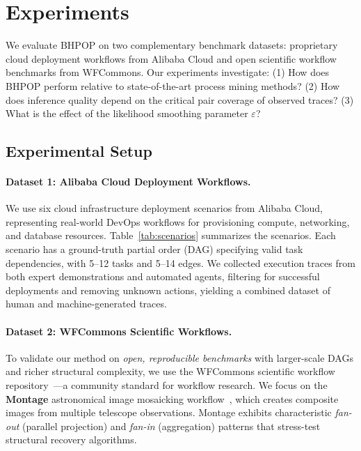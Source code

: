 \section{Experiments}
\label{sec:experiments}

We evaluate \textsc{BHPOP} on two complementary benchmark datasets: proprietary cloud deployment workflows from Alibaba Cloud and open scientific workflow benchmarks from WFCommons. Our experiments investigate: (1) How does \textsc{BHPOP} perform relative to state-of-the-art process mining methods? (2) How does inference quality depend on the critical pair coverage of observed traces? (3) What is the effect of the likelihood smoothing parameter $\varepsilon$?

\subsection{Experimental Setup}

\paragraph{Dataset 1: Alibaba Cloud Deployment Workflows.}
We use six cloud infrastructure deployment scenarios from Alibaba Cloud, representing real-world DevOps workflows for provisioning compute, networking, and database resources. Table~\ref{tab:scenarios} summarizes the scenarios. Each scenario has a ground-truth partial order (DAG) specifying valid task dependencies, with 5--12 tasks and 5--14 edges. We collected execution traces from both expert demonstrations and automated agents, filtering for successful deployments and removing unknown actions, yielding a combined dataset of human and machine-generated traces.

\paragraph{Dataset 2: WFCommons Scientific Workflows.}
To validate our method on \emph{open, reproducible benchmarks} with larger-scale DAGs and richer structural complexity, we use the WFCommons scientific workflow repository~\citep{coleman2022wfcommons}---a community standard for workflow research. We focus on the \textbf{Montage} astronomical image mosaicking workflow~\citep{rynge2013producing}, which creates composite images from multiple telescope observations. Montage exhibits characteristic \emph{fan-out} (parallel projection) and \emph{fan-in} (aggregation) patterns that stress-test structural recovery algorithms.

